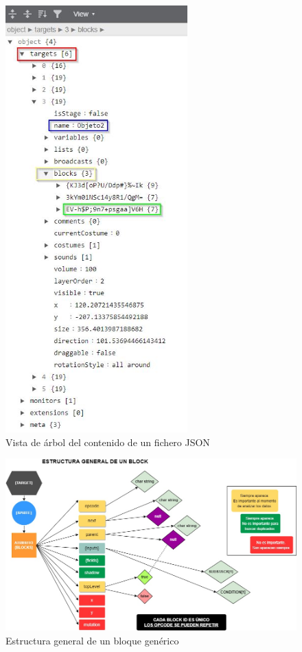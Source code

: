 \documentclass[a4paper, 12pt]{book}
\begin{document}
\begin{figure}[!htb]
  \centering
  \includegraphics[width=7cm, keepaspectratio]{img/jsontree.jpg}
  \caption{Vista de árbol del contenido de un fichero JSON}
  \label{fig:arboljson}
\end{figure}

\begin{figure}[!htb]
  \centering
  \includegraphics[width=17cm, keepaspectratio]{img/block_general.jpg}
  \caption{Estructura general de un bloque genérico}
  \label{fig:graljson}
\end{figure}
\end{document}
